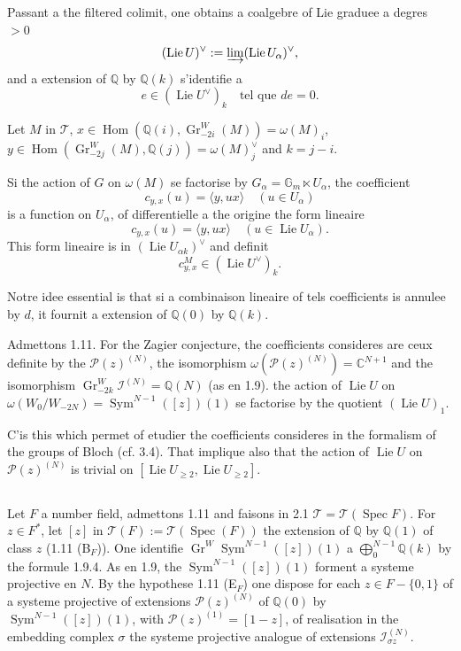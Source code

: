 \documentclass[12pt,a4paper]{article}
\theoremstyle{plain}
\theoremstyle{definition}
\theoremstyle{remark}
\DeclareMathOperator{\Hom}{Hom}
\DeclareMathOperator{\Sym}{Sym}
\DeclareMathOperator{\Spec}{Spec}
\DeclareMathOperator{\Lie}{Lie}
\newcommand{\Q}{\mathbb{Q}}
\newcommand{\C}{\mathbb{C}}
\newcommand{\Gm}{\mathbb{G}_m}
\begin{document}
{Passant {a} the filtered colimit, one obtains a coalg{e}bre of Lie gradu{e}e {a} degr{e}s $>0$
\begin{equation*}
(\Lie U)^\vee := \varinjlim(\Lie U_\alpha)^\vee,
\end{equation*}
and a extension of $\Q$ by $\Q(k)$ s'identifie {a}
\begin{equation*}
e\in(\Lie U^\vee)_k \quad \text{tel que }de=0.
\end{equation*}

Let $M$ in $\mathcal{T}$, $x\in\Hom(\Q(i),\operatorname{Gr}^W_{-2i}(M))=\omega(M)_i$, $y\in\Hom(\operatorname{Gr}^W_{-2j}(M),\Q(j))=\omega(M)_j^\vee$ and $k=j-i$.

Si the action of $G$ on $\omega(M)$ se factorise by $G_\alpha=\Gm\ltimes U_\alpha$, the coefficient
\begin{equation*}
c_{y,x}(u) = \langle y,ux\rangle \quad (u\in U_\alpha)
\end{equation*}
is a function on $U_\alpha$, of diff{e}rentielle {a} the origine the form lin{e}aire
\begin{equation*}
c_{y,x}(u) = \langle y,ux\rangle \quad (u\in\Lie U_\alpha).
\end{equation*}
This form lin{e}aire is in $(\Lie U_{\alpha k})^\vee$ and d{e}finit
\begin{equation*}
c_{y,x}^M\in(\Lie U^\vee)_k.
\end{equation*}

Notre id{e}e essential is that si a combinaison lin{e}aire of tels coefficients is annul{e}e by $d$, it fournit a extension of $\Q(0)$ by $\Q(k)$.

Admettons 1.11. For the Zagier conjecture, the coefficients consid{e}r{e}s are ceux d{e}finite by the $\mathcal{P}(z)^{(N)}$, the isomorphism $\omega(\mathcal{P}(z)^{(N)})=\C^{N+1}$ and the isomorphism $\operatorname{Gr}^W_{-2k}\mathcal{I}^{(N)}=\Q(N)$ (as en 1.9). the action of $\Lie U$ on $\omega(W_0/W_{-2N})=\Sym^{N-1}([z])(1)$ se factorise by the quotient $(\Lie U)_1$.

C'is this which permet of {e}tudier the coefficients consid{e}r{e}s in the formalism of the groups of Bloch (cf. 3.4). That implique also that the action of $\Lie U$ on $\mathcal{P}(z)^{(N)}$ is trivial on $[\Lie U_{\geq 2},\Lie U_{\geq 2}]$.

\subsection{}

Let $F$ a number field, admettons 1.11 and faisons in 2.1 $\mathcal{T}=\mathcal{T}(\Spec F)$. For $z\in F^*$, let $[z]$ in $\mathcal{T}(F):=\mathcal{T}(\Spec(F))$ the extension of $\Q$ by $\Q(1)$ of class $z$ (1.11 (B$_F$)). One identifie $\operatorname{Gr}^W\Sym^{N-1}([z])(1)$ {a} $\bigoplus_0^{N-1}\Q(k)$ by the formule 1.9.4. As en 1.9, the $\Sym^{N-1}([z])(1)$ forment a syst{e}me projective en $N$. By the hypoth{e}se 1.11 (E$_F$) one dispose for each $z\in F-\{0,1\}$ of a syst{e}me projective of extensions $\mathcal{P}(z)^{(N)}$ of $\Q(0)$ by $\Sym^{N-1}([z])(1)$, with $\mathcal{P}(z)^{(1)}=[1-z]$, of r{e}alisation in the embedding complex $\sigma$ the syst{e}me projective analogue of extensions $\mathcal{I}^{(N)}_{\sigma z}$.

}
\end{document}

